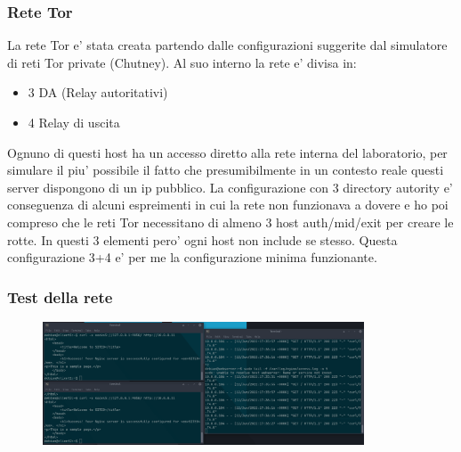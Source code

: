 \documentclass{beamer}[10pt]
\begin{document}
\begin{frame}
  \frametitle{Rete Tor}
  La rete Tor e' stata creata partendo dalle configurazioni suggerite dal simulatore di reti Tor private (Chutney). Al suo interno la rete e' divisa in:
  \begin{itemize}
    \item 3 DA (Relay autoritativi)
    \item 4 Relay di uscita
  \end{itemize}
  Ognuno di questi host ha un accesso diretto alla rete interna del laboratorio, per simulare il piu' possibile il fatto che presumibilmente in un contesto reale questi server dispongono di un ip pubblico.
  La configurazione con 3 directory autority e' conseguenza di alcuni espreimenti in cui la rete non funzionava a dovere e ho poi compreso che le reti Tor necessitano di almeno 3 host auth/mid/exit per creare le rotte. 
  In questi 3 elementi pero' ogni host non include se stesso. Questa configurazione 3+4 e' per me la configurazione minima funzionante.
\end{frame}


\begin{frame}
  \frametitle{Test della rete}
  \begin{figure}
    \centering
    \includegraphics[width=0.851\textwidth]{../img/terminali_2.png}
  \end{figure}
\end{frame}



\end{document}
